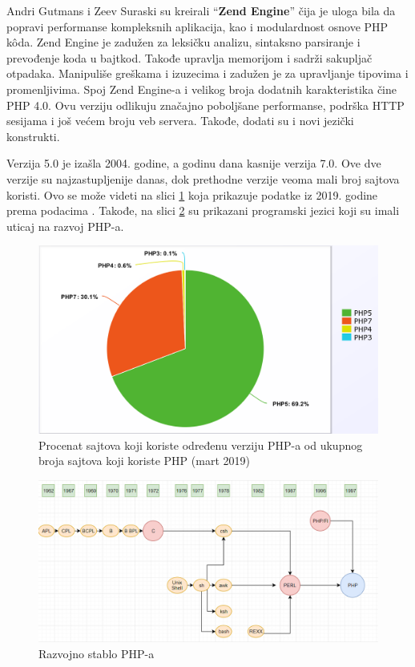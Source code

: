 \documentclass[a4paper]{article}
\begin{document}
{Andri Gutmans i Zeev Suraski su kreirali “\textbf{Zend Engine}” \cite{zend} čija je uloga bila da popravi performanse kompleksnih aplikacija, kao i modulardnost osnove PHP k\^{o}da. Zend Engine je zadužen za leksičku analizu, sintaksno parsiranje i prevođenje koda u bajtkod. Takođe upravlja memorijom i sadrži sakupljač otpadaka. Manipuliše greškama i izuzecima i zadužen je za upravljanje tipovima i promenljivima. Spoj Zend Engine-a i velikog broja dodatnih karakteristika čine PHP 4.0. Ovu verziju odlikuju značajno poboljšane performanse, podrška HTTP sesijama \cite{httpsession} i još većem broju veb servera. Takođe, dodati su i novi jezički konstrukti.

Verzija 5.0 je izašla 2004. godine, a godinu dana kasnije verzija 7.0. Ove dve verzije su najzastupljenije danas, dok prethodne verzije veoma mali broj sajtova koristi. Ovo se može videti na slici \ref{fig:proc_zastupljenosti} koja prikazuje podatke iz 2019. godine prema podacima \cite{stats}. Takođe, na slici \ref{fig:r_stablo} su prikazani programski jezici koji su imali uticaj na razvoj PHP-a.

\begin{figure}[h!]
\begin{center}
\includegraphics[scale=0.25]{zastupljenost2019.png}
\end{center}
\caption{Procenat sajtova koji koriste određenu verziju PHP-a od ukupnog broja sajtova koji koriste PHP (mart 2019)}
\label{fig:proc_zastupljenosti}
\end{figure}



\begin{figure}[h!]
\begin{center}
\includegraphics[scale=0.45]{razvojno_stablo.png}
\end{center}
\caption{Razvojno stablo PHP-a}
\label{fig:r_stablo}
\end{figure}

}
\end{document}
